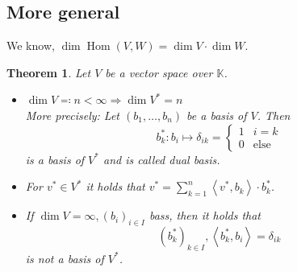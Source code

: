 \documentclass[a4paper,landscape,twocolumn]{article}
\newcommand\functional[1]{\left\langle{#1}\right\rangle}
\newtheorem{theorem}{Theorem}
\DeclareMathOperator\Hom{Hom} %
\begin{document}
\subsection{More general}
%
%
We know, $\dim{\Hom(V,W)} = \dim{V} \cdot \dim{W}$.
\begin{theorem}
  \label{5.26}
  Let $V$ be a vector space over $\mathbb K$.
  \begin{itemize}
    \item $\dim{V} \eqqcolon n < \infty \Rightarrow \dim{V^*} = n$ \\
      More precisely: Let $(b_1, \ldots, b_n)$ be a basis of $V$.
      Then \[
        b_k^*: b_i \mapsto \delta_{ik} = \begin{cases} 1 & i = k \\ 0 & \text{else} \end{cases}
      \]
      is a basis of $V^*$ and is called \emph{dual basis}.
    \item For $v^* \in V^*$ it holds that $v^* = \sum_{k=1}^n \functional{v^*, b_k} \cdot b_k^*$.
    \item If $\dim{V} = \infty, (b_i)_{i \in I}$ bass, then it holds that
      \[ (b^*_k)_{k \in I}, \functional{b_k^*, b_i} = \delta_{ik} \]
      is \emph{not} a basis of $V^*$.
  \end{itemize}
\end{theorem}
\end{document}
